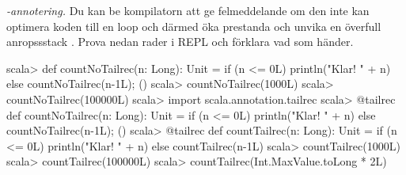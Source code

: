 \Task \emph{-annotering.} Du kan be kompilatorn att ge felmeddelande om den inte kan optimera koden till en loop och därmed öka prestanda och unvika en överfull anropssstack . Prova nedan rader i REPL och förklara vad som händer. 
\begin{REPL}
scala> def countNoTailrec(n: Long): Unit = 
         if (n <= 0L) println("Klar! " + n) else {countNoTailrec(n-1L); ()}
scala> countNoTailrec(1000L)
scala> countNoTailrec(100000L) 
scala> import scala.annotation.tailrec
scala> @tailrec def countNoTailrec(n: Long): Unit = 
         if (n <= 0L) println("Klar! " + n) else {countNoTailrec(n-1L); ()}        
scala> @tailrec def countTailrec(n: Long): Unit = 
         if (n <= 0L) println("Klar! " + n) else countTailrec(n-1L)
scala> countTailrec(1000L)
scala> countTailrec(100000L)
scala> countTailrec(Int.MaxValue.toLong * 2L)
\end{REPL}



